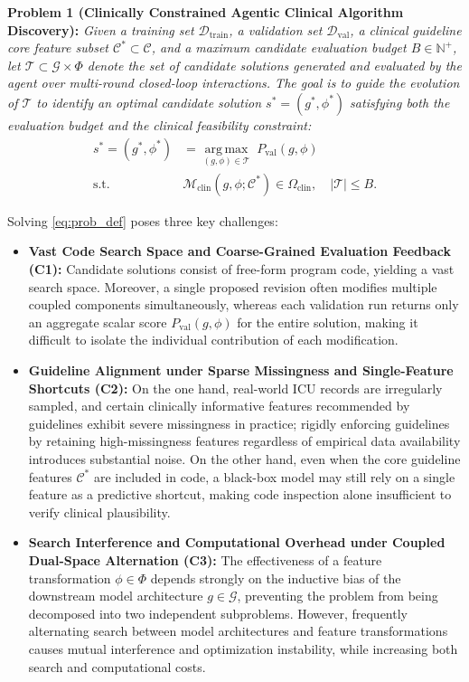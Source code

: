 \textbf{Problem 1 (Clinically Constrained Agentic Clinical Algorithm Discovery):} \textit{Given a training set $\mathcal{D}_{\text{train}}$, a validation set $\mathcal{D}_{\text{val}}$, a clinical guideline core feature subset $\mathcal{C}^* \subset \mathcal{C}$, and a maximum candidate evaluation budget $B \in \mathbb{N}^+$, let $\mathcal{T} \subset \mathcal{G} \times \Phi$ denote the set of candidate solutions generated and evaluated by the agent over multi-round closed-loop interactions. The goal is to guide the evolution of $\mathcal{T}$ to identify an optimal candidate solution $s^* = (g^*, \phi^*)$ satisfying both the evaluation budget and the clinical feasibility constraint:}
\begin{equation}\label{eq:prob_def}
\begin{aligned}
s^* = (g^*, \phi^*) &= \operatorname*{arg\,max}_{(g, \phi) \in \mathcal{T}} \; P_{\text{val}}(g, \phi) \\
\text{s.t.} \quad & \mathcal{M}_{\text{clin}}(g, \phi; \mathcal{C}^*) \in \Omega_{\text{clin}}, \quad |\mathcal{T}| \le B.
\end{aligned}
\end{equation}

Solving \eqref{eq:prob_def} poses three key challenges:
\begin{itemize}
\item \textbf{Vast Code Search Space and Coarse-Grained Evaluation Feedback (C1):} Candidate solutions consist of free-form program code, yielding a vast search space. Moreover, a single proposed revision often modifies multiple coupled components simultaneously, whereas each validation run returns only an aggregate scalar score $P_{\text{val}}(g, \phi)$ for the entire solution, making it difficult to isolate the individual contribution of each modification.
\item \textbf{Guideline Alignment under Sparse Missingness and Single-Feature Shortcuts (C2):} On the one hand, real-world ICU records are irregularly sampled, and certain clinically informative features recommended by guidelines exhibit severe missingness in practice; rigidly enforcing guidelines by retaining high-missingness features regardless of empirical data availability introduces substantial noise. On the other hand, even when the core guideline features $\mathcal{C}^*$ are included in code, a black-box model may still rely on a single feature as a predictive shortcut, making code inspection alone insufficient to verify clinical plausibility.
\item \textbf{Search Interference and Computational Overhead under Coupled Dual-Space Alternation (C3):} The effectiveness of a feature transformation $\phi \in \Phi$ depends strongly on the inductive bias of the downstream model architecture $g \in \mathcal{G}$, preventing the problem from being decomposed into two independent subproblems. However, frequently alternating search between model architectures and feature transformations causes mutual interference and optimization instability, while increasing both search and computational costs.
\end{itemize}
